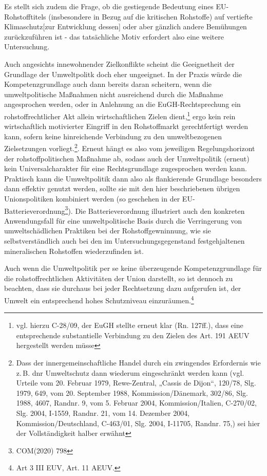 \documentclass[12pt,a4paper,oneside]{book} %
\begin{document}
Es stellt sich zudem die Frage, ob die gestiegende Bedeutung eines EU-Rohstofftitels (insbesondere in Bezug auf die kritischen Rohstoffe) auf vertiefte Klimaschutz[zur Entwicklung dessen]\autocite{Gundel in Tehobald/Kühling, IV, Energieumweltrecht, Rn. 74ff.} oder aber gänzlich andere Bemühungen zurückzuführen ist - das tatsächliche Motiv erfordert also eine weitere Untersuchung.
	
Auch angesichts innewohnender Zielkonflikte scheint die Geeignetheit der Grundlage der Umweltpolitk doch eher ungeeignet. In der Praxis würde die Kompetenzgrundlage auch dann bereits daran scheitern, wenn die umweltpolitische Maßnahmen nicht ausreichend durch die Maßnahme angesprochen werden, oder in Anlehnung an die EuGH-Rechtsprechung ein rohstoffrechtlicher Akt allein wirtschaftlichen Zielen dient,\footnote{vgl. hierzu C-28/09, der EuGH stellte erneut klar (Rn. 127ff.), dass eine entsprechende substantielle Verbindung zu den Zielen des Art. 191 AEUV hergestellt werden müsse} ergo kein rein wirtschaftlich motivierter Eingriff in den Rohstoffmarkt gerechtfertigt werden kann, sofern keine hinreichende Verbindung zu den umweltbezogenen Zielsetzungen vorliegt.\footnote{Dass der innergemeinschaftliche Handel durch ein zwingendes Erfordernis wie z.\,B. dnr Umweltschutz dann wiederum eingeschränkt werden kann (vgl. Urteile vom 20. Februar 1979, Rewe-Zentral, „Cassis de Dijon“, 120/78, Slg. 1979, 649, vom 20. September 1988, Kommission/Dänemark, 302/86, Slg. 1988, 4607, Randnr. 9, vom 5. Februar 2004, Kommission/Italien, C‑270/02, Slg. 2004, I‑1559, Randnr. 21, vom 14. Dezember 2004, Kommission/Deutschland, C‑463/01, Slg. 2004, I‑11705, Randnr. 75,) sei hier der Vollständigkeit halber erwähnt}. Erneut hängt es also vom jeweiligen Regelungshorizont der rohstoffpolitischen Maßnahme ab, sodass auch der Umweltpolitik (erneut) kein Universalcharakter für eine Rechtsgrundlage zugesprochen werden kann. Praktisch kann die Umweltpolitik dann also als flankierende Grundlage besonders dann effektiv genutzt werden, sollte sie mit den hier beschriebenen übrigen Unionspolitiken kombiniert werden (so geschehen in der EU-Batterieverordnung\footnote{COM(2020) 798}). Die Batterieverordnung illustriert auch den konkreten Anwendungsfall für eine umweltpolitische Basis durch die Verringerung von umweltschädlichen Praktiken bei der Rohstoffgewninnung, wie sie selbstverständlich auch bei den im Untersuchungsgegenstand festgehjaltenen mineralischen Rohstoffen wiederzufinden ist.
	
Auch wenn die Umweltpolitik per se keine überzeugende Kompetenzgrundlage für die rohstoffrechtlichen Aktivitäten der Union darstellt, so ist dennoch zu beachten, dass sie durchaus bei jeder Rechtsetzung dazu aufgerufen ist, der Umwelt ein entsprechend hohes Schutzniveau einzuräumen.\footnote{Art 3 III EUV, Art. 11 AEUV.}
	
\end{document}
